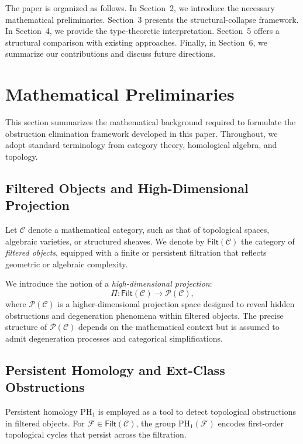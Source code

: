 \documentclass[11pt]{article}
\begin{document}
The paper is organized as follows. In Section~2, we introduce the necessary mathematical preliminaries. Section~3 presents the structural-collapse framework. In Section~4, we provide the type-theoretic interpretation. Section~5 offers a structural comparison with existing approaches. Finally, in Section~6, we summarize our contributions and discuss future directions.


\section{Mathematical Preliminaries}

This section summarizes the mathematical background required to formulate the obstruction elimination framework developed in this paper. Throughout, we adopt standard terminology from category theory, homological algebra, and topology.

\subsection{Filtered Objects and High-Dimensional Projection}

Let $\mathcal{C}$ denote a mathematical category, such as that of topological spaces, algebraic varieties, or structured sheaves. We denote by $\mathsf{Filt}(\mathcal{C})$ the category of \emph{filtered objects}, equipped with a finite or persistent filtration that reflects geometric or algebraic complexity.

We introduce the notion of a \emph{high-dimensional projection}:
\[
\Pi : \mathsf{Filt}(\mathcal{C}) \longrightarrow \mathcal{P}(\mathcal{C}),
\]
where $\mathcal{P}(\mathcal{C})$ is a higher-dimensional projection space designed to reveal hidden obstructions and degeneration phenomena within filtered objects. The precise structure of $\mathcal{P}(\mathcal{C})$ depends on the mathematical context but is assumed to admit degeneration processes and categorical simplifications.

\subsection{Persistent Homology and Ext-Class Obstructions}

Persistent homology $\mathrm{PH}_1$ is employed as a tool to detect topological obstructions in filtered objects. For $\mathcal{F} \in \mathsf{Filt}(\mathcal{C})$, the group $\mathrm{PH}_1(\mathcal{F})$ encodes first-order topological cycles that persist across the filtration.
\end{document}
